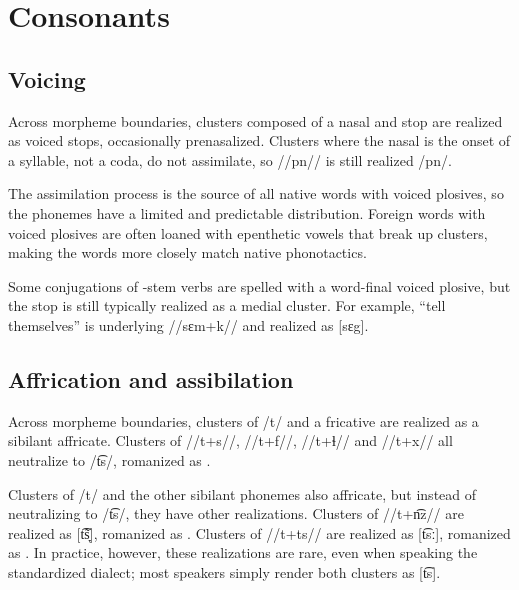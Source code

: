 \section{Consonants} 
\subsection{Voicing} \label{sub:voicing}
Across morpheme boundaries, clusters composed of a nasal and stop are realized as voiced stops, occasionally prenasalized.  Clusters where the nasal is the onset of a syllable, not a coda, do not assimilate, so //pn// is still realized /pn/. 

The assimilation process is the source of all native words with voiced plosives, so the phonemes have a limited and predictable distribution.  Foreign words with voiced plosives are often loaned with epenthetic vowels that break up clusters, making the words more closely match native phonotactics. %

Some conjugations of -stem verbs are spelled with a word-final voiced plosive, but the stop is still typically realized as a medial cluster. For example,  “tell themselves” is underlying //sɛm+k// and realized as [sɛg]. 

\subsection{Affrication and assibilation} \label{sub:affrication}
Across morpheme boundaries, clusters of /t/ and a fricative are realized as a sibilant affricate. Clusters of //t+s//, //t+f//, //t+ɬ// and //t+x// all neutralize to /t͡s/, romanized as . 

Clusters of /t/ and the other sibilant phonemes also affricate, but instead of neutralizing to /t͡s/, they have other realizations. Clusters of //t+n͡z// are realized as [t͡s̞̃], romanized as .  Clusters of //t+ts// are realized as [t͡sː], romanized as . In practice, however, these realizations are rare, even when speaking the standardized dialect; most speakers simply render both clusters as [t͡s].

